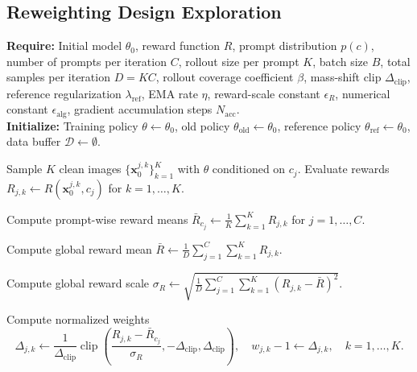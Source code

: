 \documentclass{article} %
\begin{document}
\subsection{Reweighting Design Exploration}
\begin{algorithm}[H]
    \caption{Single Target Loss Base Scheme }
    \label{alg:velocity-add-delete}
    \textbf{Require:} Initial model $\theta_0$, reward function $R$, prompt distribution $p(c)$, number of prompts per iteration $C$, rollout size per prompt $K$, batch size $B$, total samples per iteration $D = KC$, rollout coverage coefficient $\beta$, mass-shift clip $\Delta_{\mathrm{clip}}$, reference regularization $\lambda_{\mathrm{ref}}$, EMA rate $\eta$, reward-scale constant $\epsilon_R$, numerical constant $\epsilon_{\mathrm{alg}}$, gradient accumulation steps $N_{\mathrm{acc}}$.\\
    \textbf{Initialize:} Training policy $\theta \leftarrow \theta_0$, old policy $\theta_{\mathrm{old}} \leftarrow \theta_0$, reference policy $\theta_{\mathrm{ref}} \leftarrow \theta_0$, data buffer $\mathcal{D} \leftarrow \emptyset$.
    \begin{algorithmic}[1]
             
                \State Sample $K$ clean images $\{\mathbf{x}_0^{j,k}\}_{k=1}^{K}$ with $\theta$ conditioned on $c_j$.
                \State Evaluate rewards $R_{j,k} \leftarrow R(\mathbf{x}_0^{j,k}, c_j)$ for $k = 1, \dots, K$.
            \EndFor

            \State Compute prompt-wise reward means
            $\bar{R}_{c_j} \leftarrow \frac{1}{K}\sum_{k=1}^{K} R_{j,k}$ for $j = 1, \dots, C$.

            \State Compute global reward mean
            $\bar{R} \leftarrow \frac{1}{D}\sum_{j=1}^{C}\sum_{k=1}^{K} R_{j,k}$.

            \State Compute global reward scale
            $\sigma_R \leftarrow \sqrt{\frac{1}{D}\sum_{j=1}^{C}\sum_{k=1}^{K}(R_{j,k} - \bar{R})^2}.$

                \State Compute normalized weights
                \[
                    \Delta_{j,k} \leftarrow \frac{1}{\Delta_{\mathrm{clip}}}
                    \operatorname{clip}\!\left(
                        \frac{R_{j,k} - \bar{R}_{c_j}}{\sigma_R},
                        -\Delta_{\mathrm{clip}},
                        \Delta_{\mathrm{clip}}
                    \right),
                    \quad
                    w_{j,k}-1\leftarrow \Delta_{j,k},
                    \quad k = 1, \dots, K.
                \]


\end{algorithmic}
\end{algorithm}
\end{document}
